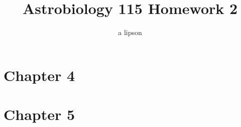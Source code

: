 \documentclass{article}
\title{Astrobiology 115 Homework 2}
\author{a lipson}
\begin{document}
\maketitle

\section*{Chapter 4}



\section*{Chapter 5}

\end{document}
